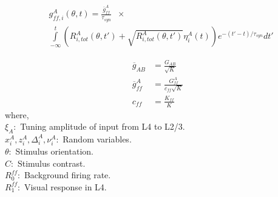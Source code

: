 \begin{equation} 
\begin{split}
& g_{ff, i}^{A} (\theta, t)  = \frac{\bar{g}^{A}_{ff}}{\tau_{syn}} \;\; \times \\
& \int\limits_{-\infty}^{t}  \left( R_{i, tot}^{A} (\theta, t') + \sqrt{R_{i, tot}^{A} (\theta, t')}  \eta^{A}_{i}(t) \right) e^{-(t' - t) /\tau_{syn}} dt' 
\end{split}
\end{equation}




\begin{align}
\overline{g}_{AB} &= \frac{G_{AB}}{\sqrt{K}} \\
\overline{g}^{A}_{ff} &= \frac{G^{A}_{ff}}{c_{ff} \sqrt{K}} \\
c_{ff} &= \frac{K_{ff}}{K}
\end{align}
where, \\
$\xi_A:$ Tuning amplitude of input from L4 to L2/3. \\
$x^A_i, z^A_i , \Delta^A_i , \nu^A_i:$ Random variables. \\
$\theta:$ Stimulus orientation. \\  
$C:$ Stimulus contrast. \\
$R_0^{ff}:$ Background firing rate. \\
$R_1^{ff}:$ Visual response in L4. \\

